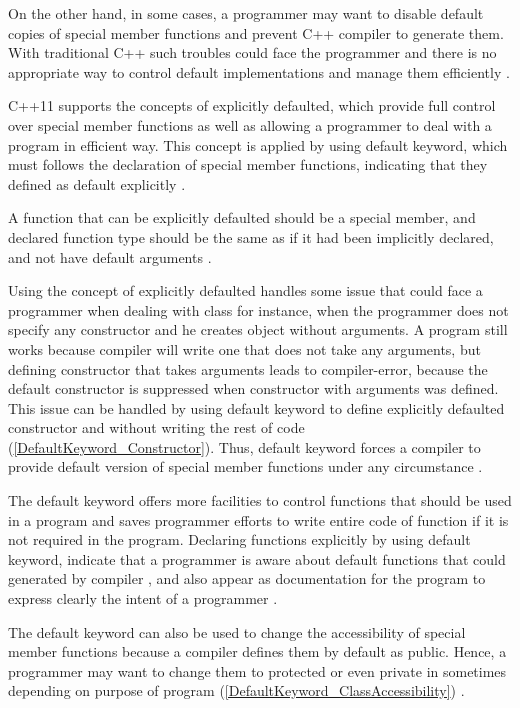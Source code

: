 \documentclass[11pt]{report}
\begin{document}
On the other hand, in some cases, a programmer may want to disable default copies of special member functions and prevent C++ compiler to generate them. With traditional C++ such troubles could face the programmer and there is no appropriate way to control default implementations and manage them efficiently \cite{ISO:2011:Cpplanguage}.


C++11 supports the concepts of explicitly defaulted, which provide full control over special member functions as well as allowing a programmer to deal with a program in efficient way. This concept is applied by using default keyword, which must follows the declaration of special member functions, indicating that they defined as default explicitly \cite{Prata:2012:Cpp}.


A function that can be explicitly defaulted should be a special member, and declared function type should be the same as if it had been implicitly declared, and not have default arguments \cite{ISO:2011:Cpplanguage}.


Using the concept of explicitly defaulted handles some issue that could face a programmer when dealing with class for instance, when the programmer does not specify any constructor and he creates object without arguments. A program still works because compiler will write one that does not take any arguments, but defining constructor that takes arguments leads to compiler-error, because the default constructor is suppressed when constructor with arguments was defined. This issue can be handled by using default keyword to define explicitly defaulted constructor and without writing the rest of code (\ref{DefaultKeyword_Constructor}). Thus, default keyword forces a compiler to provide default version of special member functions under any circumstance \cite{Gregorie:professionalcpp}.


The default keyword offers more facilities to control functions that should be used in a program and saves programmer efforts to write entire code of function if it is not required in the program.  Declaring functions  explicitly by using default keyword, indicate  that  a programmer is  aware about  default functions that could generated by compiler , and also appear as documentation for the program to express clearly  the intent of a programmer \cite{Horstmann:2008:BC}.


The default keyword can also be used to change the accessibility of special member functions because a compiler defines them by default as public. Hence, a programmer may want to change them to protected or even private in sometimes depending on purpose of program (\ref{DefaultKeyword_ClassAccessibility}) \cite{Williams:2012:CCA}.
\end{document}
